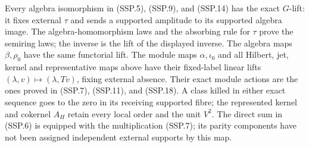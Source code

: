 Every algebra isomorphism in (SSP.5), (SSP.9), and (SSP.14)
has the exact \(G\)-lift: it fixes external \(\tau\) and
sends a supported amplitude to its supported algebra image.
The algebra-homomorphism laws and the absorbing rule for
\(\tau\) prove the semiring laws; the inverse is the lift
of the displayed inverse.  The algebra maps \(\beta,\rho_0\)
have the same functorial lift.
The module maps \(\alpha,\iota_0\) and all Hilbert, jet,
kernel and representative maps above have their fixed-label
linear lifts \((\lambda,v)\mapsto(\lambda,Tv)\), fixing
external absence.  Their exact module actions are the ones
proved in (SSP.7), (SSP.11), and (SSP.18).
A class killed in either exact sequence goes to the zero
in its receiving supported fibre; the represented kernel
and cokernel \(A_H\) retain every local order and the
unit \(V^2\).  The direct sum in (SSP.6) is equipped with
the multiplication (SSP.7); its parity components have not
been assigned independent external supports by this map.

